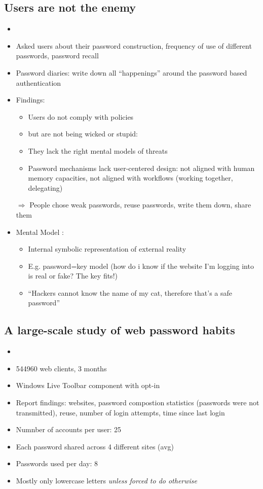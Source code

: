 \documentclass[a4paper,12pt]{scrartcl}
\begin{document}
\subsection{Users are not the enemy}
\begin{itemize}
	\item
	\item
		Asked users about their password construction, frequency of use of different passwords, password recall
	\item
		Password diaries: write down all \enquote{happenings} around the password based authentication
	\item
		Findings:
		\begin{itemize}
			\item
				Users do not comply with policies
			\item
				but are not being wicked or stupid:
			\item
				They lack the right mental models of threats
			\item
				Password mechanisms lack user-centered design: not aligned with human memory capacities, not aligned with workflows (working together, delegating)
		\end{itemize}

		$\Rightarrow$ People chose weak passwords, reuse passwords, write them down, share them
	\item
		Mental Model :
		\begin{itemize}
			\item
				Internal symbolic representation of external reality
			\item
				E.g. password=key model (how do i know if the website I'm logging into is real or fake? The key fits!)
			\item
				\enquote{Hackers cannot know the name of my cat, therefore that's a safe password}
		\end{itemize}
\end{itemize}

\subsection{A large-scale study of web password habits}
\begin{itemize}
	\item
	\item
		544960 web clients, 3 months
	\item
		Windows Live Toolbar component with opt-in
	\item
		Report findings: websites, password compostion statistics (passwords were not transmitted), reuse, number of login attempts, time since last login
	\item
		Numnber of accounts per user: 25
	\item
		Each password shared across 4 different sites (avg)
	\item
		Passwords used per day: 8
	\item
		Mostly only lowercase letters \textit{unless forced to do otherwise}
\end{itemize}
\end{document}
